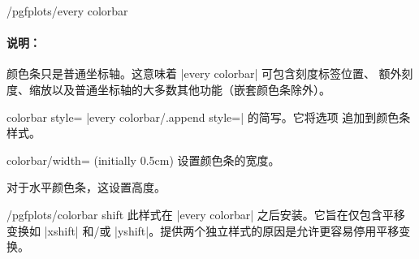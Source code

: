 \begin{stylekey}{/pgfplots/every colorbar}
    \paragraph{说明：}

    颜色条只是普通坐标轴。这意味着 |every colorbar| 可包含刻度标签位置、
    额外刻度、缩放以及普通坐标轴的大多数其他功能（嵌套颜色条除外）。
\end{stylekey}

\begin{pgfplotskey}{colorbar style=}
    |every colorbar/.append style=| 的简写。它将选项
    追加到颜色条样式。
\end{pgfplotskey}

\begin{pgfplotskey}{colorbar/width= (initially 0.5cm)}
    设置颜色条的宽度。
\pgfplotsexpensiveexample
\begin{codeexample}[]
\end{codeexample}

    对于水平颜色条，这设置高度。
\end{pgfplotskey}

\begin{stylekey}{/pgfplots/colorbar shift}
    此样式在 |every colorbar| 之后安装。它旨在仅包含平移变换如 |xshift|
    和/或 |yshift|。提供两个独立样式的原因是允许更容易停用平移变换。
\begin{codeexample}
\end{codeexample}
\end{stylekey}


